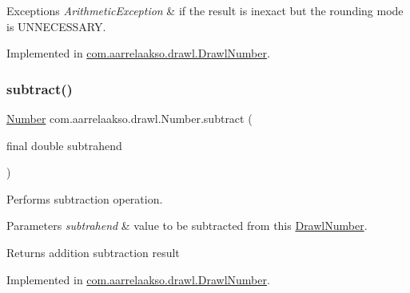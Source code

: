 \begin{DoxyExceptions}{Exceptions}
{\em Arithmetic\+Exception} & if the result is inexact but the rounding mode is U\+N\+N\+E\+C\+E\+S\+S\+A\+RY. \\
\hline
\end{DoxyExceptions}


Implemented in \hyperlink{classcom_1_1aarrelaakso_1_1drawl_1_1_drawl_number_aaf0d1f797d24144d3ec2dba861217cb9}{com.\+aarrelaakso.\+drawl.\+Drawl\+Number}.

\mbox{\label{interfacecom_1_1aarrelaakso_1_1drawl_1_1_number_ac04969f656d823c91e55a798df7d6913}} 
\subsubsection{\texorpdfstring{subtract()}{subtract()}\hspace{0.1cm}{\footnotesize\ttfamily [3/3]}}
{\footnotesize\ttfamily \hyperlink{interfacecom_1_1aarrelaakso_1_1drawl_1_1_number}{Number} com.\+aarrelaakso.\+drawl.\+Number.\+subtract (\begin{DoxyParamCaption}\item[{final double}]{subtrahend }\end{DoxyParamCaption})}



Performs subtraction operation. 


\begin{DoxyParams}{Parameters}
{\em subtrahend} & value to be subtracted from this \hyperlink{classcom_1_1aarrelaakso_1_1drawl_1_1_drawl_number}{Drawl\+Number}. \\
\hline
\end{DoxyParams}
\begin{DoxyReturn}{Returns}
addition subtraction result 
\end{DoxyReturn}


Implemented in \hyperlink{classcom_1_1aarrelaakso_1_1drawl_1_1_drawl_number_ade985c4a55ea33886939801ceacd254c}{com.\+aarrelaakso.\+drawl.\+Drawl\+Number}.

\mbox{\label{interfacecom_1_1aarrelaakso_1_1drawl_1_1_number_a8e672210b2f919571e6b09d4cb95c569}} 
